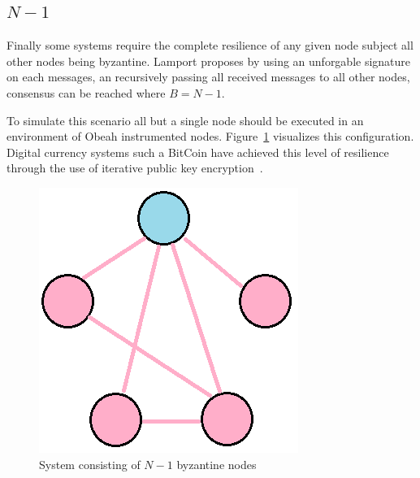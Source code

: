 \subsection{$N-1$}

Finally some systems require the complete resilience of any given node subject all other nodes being byzantine. Lamport proposes by using an unforgable signature on each messages, an recursively passing all received messages to all other nodes, consensus can be reached where $B = N -1$.

To simulate this scenario all but a single node should be executed in an
environment of Obeah instrumented nodes. Figure~\ref{fig:n-1byzantine} visualizes this
configuration. Digital currency systems such a BitCoin have achieved this level
of resilience through the use of iterative public key
encryption~\cite{Nakamoto_bitcoin:a}.

\begin{figure}[h] \includegraphics[width=0.5\linewidth]{fig/n-1byzantine}%
    \caption{System consisting of $N-1$ byzantine nodes\label{fig:n-1byzantine}}%
\end{figure}
